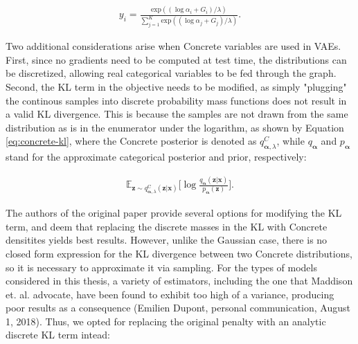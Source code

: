 \documentclass{report}
\begin{document}
\begin{equation}
\begin{gathered}
y_i = \frac{\text{exp}((\log \alpha_i + G_i) / \lambda)}{\sum_{j=1}^K \text{exp}((\log \alpha_j + G_j) / \lambda)}.
\end{gathered}
\label{eq:gumbel-softmax}
\end{equation}

\bigskip

\noindent Two additional considerations arise when Concrete variables are used in VAEs. First, since no gradients need to be computed at test time, the distributions can be discretized, allowing real categorical variables to be fed through the graph. Second, the KL term in the objective needs to be modified, as simply "plugging" the continous samples into discrete probability mass functions does not result in a valid KL divergence. This is because the samples are not drawn from the same distribution as is in the enumerator under the logarithm, as shown by Equation \ref{eq:concrete-kl}, where the Concrete posterior is denoted as $q_{\boldsymbol{\alpha}, \lambda}^C$, while $q_{\boldsymbol{\alpha}}$ and $p_{\boldsymbol{\alpha}}$ stand for the approximate categorical posterior and prior, respectively:

\begin{equation}
\begin{gathered}
\mathbb{E}_{\boldsymbol{z} \sim q^{\text{C}}_{\boldsymbol{\alpha}, \lambda}(\boldsymbol{z} | \boldsymbol{x})} \Big[ \log \frac{q_{\boldsymbol{\alpha}}(\boldsymbol{z} | \boldsymbol{x})}{p_{\boldsymbol{\alpha}} (\boldsymbol{z})} \Big].
\end{gathered}
\label{eq:concrete-kl}
\end{equation}

\bigskip

\noindent The authors of the original paper \cite{concrete} provide several options for modifying the KL term, and deem that replacing the discrete masses in the KL with Concrete densitites yields best results. However, unlike the Gaussian case, there is no closed form expression for the KL divergence between two Concrete distributions, so it is necessary to approximate it via sampling. For the types of models considered in this thesis, a variety of estimators, including the one that Maddison et. al. \cite{concrete} advocate, have been found to exhibit too high of a variance, producing poor results as a consequence (Emilien Dupont, personal communication, August 1, 2018). Thus, we opted for replacing the original penalty with an analytic discrete KL term intead:
\end{document}
